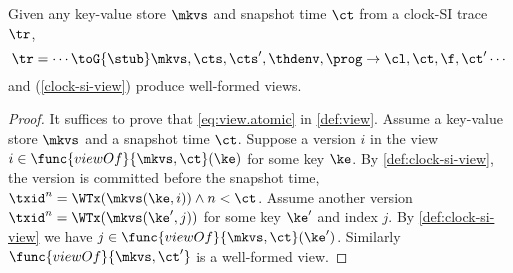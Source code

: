 \begin{lemma}
    \label{lem:well-formed-clock-si-view}
    Given any key-value store \( \mkvs \) and snapshot time \( \ct \) from a clock-SI trace \( \tr \),
    \[
        \tr = \cdots \toG{\stub} \mkvs, \cts, \cts', \thdenv, \prog \to{\cl, \ct, \f, \ct'} \cdots
    \]
     and  (\cref{clock-si-view}) produce well-formed views.
\end{lemma}
\begin{proof}                     
    It suffices to prove that \cref{eq:view.atomic} in \cref{def:view}.
    Assume a key-value store \( \mkvs \) and a snapshot time \( \ct \).
    Suppose a version \( i \) in the view \( i \in \func{viewOf}{\mkvs,\ct}(\ke)\) for some key \( \ke \).
    By \cref{def:clock-si-view}, the version is committed before the snapshot time,
    \ie \( \txid^n = \WTx(\mkvs(\ke, i)) \land n < \ct\).
    Assume another version \( \txid^n = \WTx(\mkvs(\ke', j)) \) for some key \( \ke' \) and index \( j \).
    By \cref{def:clock-si-view} we have \( j \in \func{viewOf}{\mkvs,\ct}(\ke') \).
    Similarly \( \func{viewOf}{\mkvs, \ct'} \) is a well-formed view.
\end{proof}

